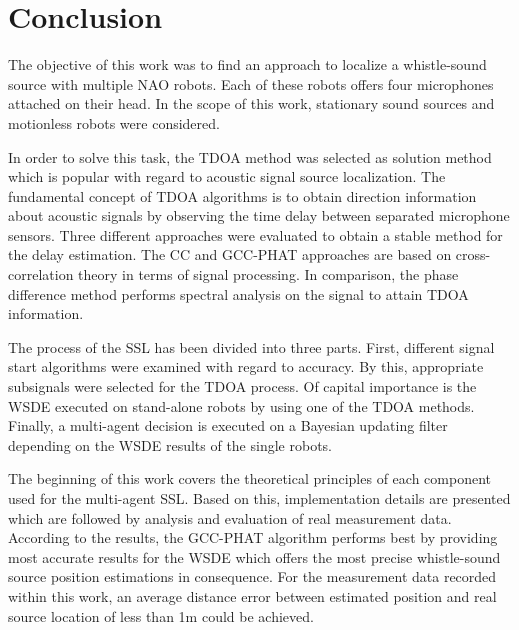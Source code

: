 \chapter{Conclusion}
\label{chap:05_conclusion}

The objective of this work was to find an approach to localize a whistle-sound
source with multiple NAO robots. 
Each of these robots offers four microphones attached on their head.
In the scope of this work, stationary sound sources and motionless robots were
considered.

In order to solve this task, the \acf{TDOA} method was selected as solution method
which is popular with regard to acoustic signal source localization.
The fundamental concept of \ac{TDOA} algorithms is to obtain direction information
about acoustic signals by observing the time delay between separated microphone sensors.
Three different approaches were evaluated to obtain a stable method
for the delay estimation.
The \acf{CC} and \acf{GCC-PHAT} approaches are based on cross-correlation theory in terms
of signal processing.
In comparison, the phase difference method performs spectral analysis on the signal
to attain \ac{TDOA} information.

The process of the \acf{SSL} has been divided into three parts.
First, different signal start algorithms were examined with regard to accuracy.
By this, appropriate subsignals were selected for the \ac{TDOA} process.
Of capital importance is the \acf{WSDE} executed on stand-alone robots by
using one of the \ac{TDOA} methods.
Finally, a multi-agent decision is executed on a Bayesian updating filter
depending on the \ac{WSDE} results of the single robots.

The beginning of this work covers the theoretical principles of each component
used for the multi-agent \ac{SSL}.
Based on this, implementation details are presented which are followed by analysis
and evaluation of real measurement data.
According to the results, the \acf{GCC-PHAT} algorithm performs best by
providing most accurate results for the \ac{WSDE} which offers the most precise
whistle-sound source position estimations in consequence.
For the measurement data recorded within this work, an average
distance error between estimated position and real source location
of less than 1\si{\meter} could be achieved.

